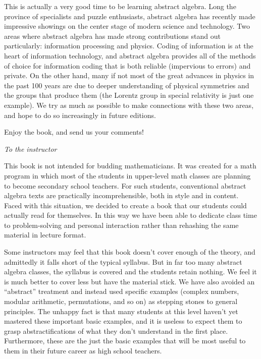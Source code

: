 This is actually a very good time to be learning abstract algebra. Long the province of specialists and puzzle enthusiasts, abstract algebra has recently made  impressive showings on the center stage of modern  science and technology. Two areas where abstract algebra has made strong contributions stand out particularly: information processing and physics. Coding of information is at the heart of information technology, and abstract algebra provides all of the methods of choice for information coding that is both reliable (impervious to errors) and private.  
On the other hand,  many if not most of the great advances in  physics in the past 100 years are due to deeper understanding of physical symmetries and the groups that produce them (the Lorentz group in special relativity is just one example). We try as much as possible to make connections with these two areas, and hope to do so increasingly in future editions. 

Enjoy the book, and send us your comments!
\medskip

\noindent
\emph{To the instructor}
\smallskip

This book  is not intended for budding mathematicians. It was created for a math program in which most of the students in upper-level math classes are planning to become secondary school teachers. For such students, conventional abstract algebra texts are practically  incomprehensible, both in style and in content. Faced with this situation, we decided to create a book that our students could actually read for themselves. In this way we have been able to dedicate class time to problem-solving and personal  interaction rather than rehashing the same material in lecture format.

Some instructors may feel that this book doesn't cover enough of the theory, and admittedly it falls short of the typical syllabus. But in far too many abstract algebra classes, the syllabus is covered and the students retain nothing. We feel it is much better to cover less but have the material stick. We have also avoided an ``abstract'' treatment and instead used specific examples (complex numbers, modular arithmetic, permutations, and so on) as stepping stones to general principles. The unhappy fact is that many students at this level haven't yet mastered these important basic examples, and it is useless to expect them to grasp abstractifications of what they don't understand in the first place. Furthermore, these are the just the basic examples that will be most useful to them in their future career as high school teachers.

